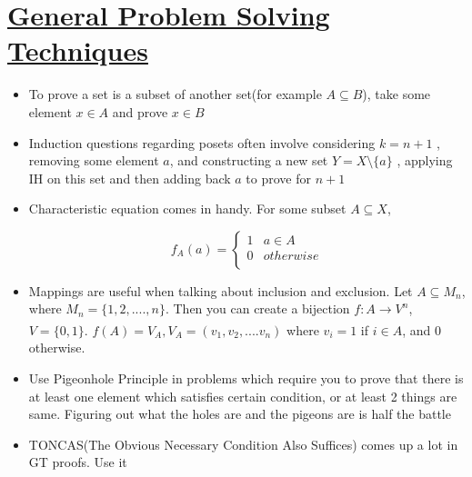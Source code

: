 \documentclass{article}
\theoremstyle{definition}
\theoremstyle{definition}
\theoremstyle{named}
\begin{document}
\section{\underline{General Problem Solving Techniques}}
\begin{itemize}
\item To prove a set is a subset of another set(for example $A \subseteq B$), take some element $x \in A$ and prove $x \in B$ 
\item Induction questions regarding posets often involve considering $k=n+1$ , removing some element $a$, and constructing a new set $Y = X \setminus  \{a\}$ , applying IH on this set and then adding back $a$ to prove for $n+1$
\item  Characteristic equation comes in handy. For some subset $A \subseteq X$, 


\[
f_A(a) =\left\{
\begin{array}{ll}
      1 & a \in  A\\
      0 & otherwise \\
\end{array} 
\right.
        \]

\item Mappings are useful when talking about inclusion and exclusion. Let $A \subseteq M_n$, where $M_n = \{1, 2, ...., n\}$. Then you can create a bijection $f:A \xrightarrow[]{} V^{n}$, $V = \{0, 1\}$. $f(A) = V_A, V_A = (v_1, v_2, .... v_n)$ where $v_i = 1$ if $i \in A$, and 0 otherwise. 

\item Use Pigeonhole Principle in problems which require you to prove that there is at least one element which satisfies certain condition, or at least 2 things are same. Figuring out what the holes are and the pigeons are is half the battle 

\item TONCAS(The Obvious Necessary Condition Also Suffices) comes up a lot in GT proofs. Use it
\end{itemize}
\end{document}
